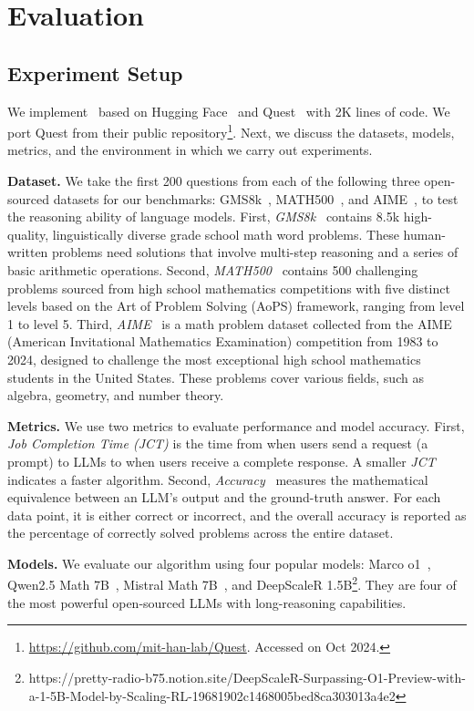 
\section{Evaluation}
\label{sec-eval}

\subsection{Experiment Setup}

We implement \algo\ based on Hugging Face~\cite{hf} and Quest~\cite{tang2024quest} with 2K lines of code. We port Quest from their public repository\footnote{\url{https://github.com/mit-han-lab/Quest}. Accessed on Oct 2024.}. Next, we discuss the datasets, models, metrics, and the environment in which we carry out experiments. 

\textbf{Dataset.} We take the first 200 questions from each of the following three open-sourced datasets for our benchmarks: GMS8k~\cite{gms8k}, MATH500~\cite{math500}, and AIME~\cite{aime}, to test the reasoning ability of language models. First, \textit{GMS8k}~\cite{gms8k} contains 8.5k high-quality, linguistically diverse grade school math word problems. These human-written problems need solutions that involve multi-step reasoning and a series of basic arithmetic operations. Second, \textit{MATH500}~\cite{math500} contains 500 challenging problems sourced from high school mathematics competitions with five distinct levels based on the Art of Problem Solving (AoPS) framework, ranging from level 1 to level 5. Third, \textit{AIME}~\cite{aime} is a math problem dataset collected from the AIME (American Invitational Mathematics Examination) competition from 1983 to 2024, designed to challenge the most exceptional high school mathematics students in the United States. These problems cover various fields, such as algebra, geometry, and number theory.

\textbf{Metrics.} We use two metrics to evaluate performance and model accuracy. First, \textit{Job Completion Time (JCT)} is the time from when users send a request (a prompt) to LLMs to when users receive a complete response. A smaller \textit{JCT} indicates a faster algorithm. Second, \textit{Accuracy}~\cite{wang2024openr} measures the mathematical equivalence between an LLM’s output and the ground-truth answer. For each data point, it is either correct or incorrect, and the overall accuracy is reported as the percentage of correctly solved problems across the entire dataset.

\textbf{Models.} We evaluate our algorithm using four popular models: Marco o1~\cite{zhao2024marco}, Qwen2.5 Math 7B~\cite{wang2024openr}, Mistral Math 7B~\cite{wang2024openr}, and DeepScaleR 1.5B\footnote{https://pretty-radio-b75.notion.site/DeepScaleR-Surpassing-O1-Preview-with-a-1-5B-Model-by-Scaling-RL-19681902c1468005bed8ca303013a4e2}. They are four of the most powerful open-sourced LLMs with long-reasoning capabilities.


